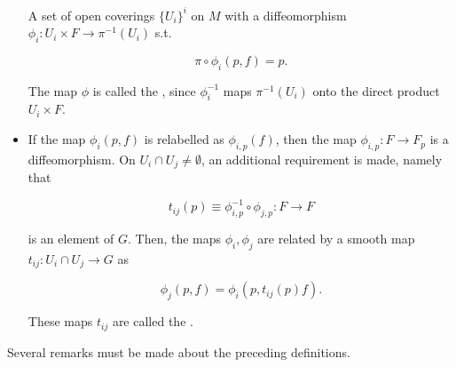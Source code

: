 \begin{df}
\begin{itemize}
\begin{df}
            A set of open coverings $\{U_i\}^i$ on $M$ with a diffeomorphism $\phi_i: U_i \times F \rightarrow \pi^{-1}(U_i)$ s.t. 

            $$
                \pi \circ \phi_i(p,f) = p.
            $$

            The map $\phi$ is called the , since $\phi^{-1}_i$ maps $\pi^{-1}(U_i)$ onto the direct product $U_i \times F$. \label{Def_Fibre_Bundle_local_trivialization}
        \end{df}
            
        \item \begin{df}
            If the map $\phi_i(p, f)$ is relabelled as $\phi_{i,p}(f)$, then the map $\phi_{i,p}: F \rightarrow F_p$ is a diffeomorphism. On $U_i \cap U_j \neq \emptyset$, an additional requirement is made, namely that 

            $$
                t_{ij}(p) \equiv \phi_{i,p}^{-1} \circ  \phi_{j,p}: F \rightarrow F
            $$

            is an element of $G$. Then, the maps $\phi_i, \phi_j$ are related by a smooth map $t_{ij}: U_i \cap U_j \rightarrow G$ as 

            $$
              \phi_j(p,f) = \phi_i(p, t_{ij}(p) f).
            $$

            These maps $t_{ij}$ are called the .
            \label{Def_Fibre_Bundle_transition_functions}
        \end{df}
    \end{itemize}
\end{df}

Several remarks must be made about the preceding definitions. \medbreak

